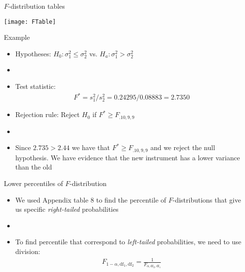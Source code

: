 \documentclass[xcolor=dvipsnames]{beamer}
\begin{document}
\begin{frame}{$F$-distribution tables}
	\begin{center}
		\texttt{[image: FTable]}
	\end{center}
\end{frame}

\begin{frame}{Example}
	\begin{itemize}
		\item Hypotheses: $H_0: \sigma_1^2 \leq \sigma_2^2$ vs. $H_a: \sigma_1^2 > \sigma_2^2$
		\item[]
		\item Test statistic:
		\begin{gather*}
		F^* = s_1^2 /s_2^2 = 0.24295 /  0.08883 = 2.7350
		\end{gather*}
		\item Rejection rule: Reject $H_0$ if $F^* \geq F_{.10, 9, 9}$
		\item[]
		\item Since $2.735 > 2.44$ we have that $F^* \geq F_{.10, 9, 9}$ and we reject the null hypothesis. We have evidence that the new instrument has a lower variance than the old
	\end{itemize}
\end{frame}

\begin{frame}{Lower percentiles of $F$-distribution}
	\begin{itemize}
		\item We used Appendix table 8 to find the percentile of $F$-distributions that give us specific \emph{right-tailed} probabilities
		\item[]
		\item To find percentile that correspond to \emph{left-tailed} probabilities, we need to use division:
		\begin{gather*}
			F_{1-\alpha, \text{df}_1, \text{df}_2} = \frac{1}{F_{\alpha, \text{df}_2, \text{df}_1}}
		\end{gather*} 
	\end{itemize}
\end{frame}
\end{document}
